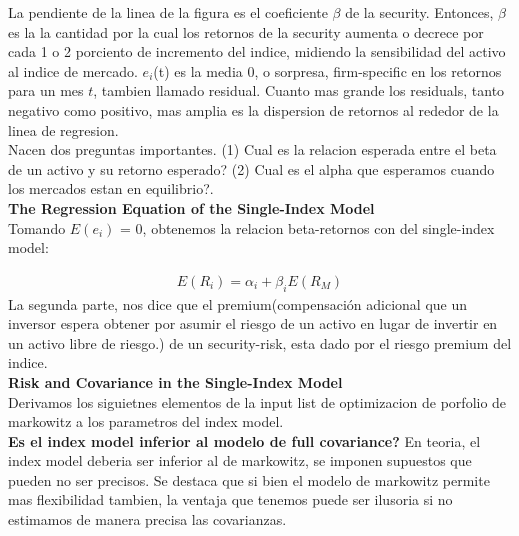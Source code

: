 \documentclass{article}
\begin{document}
La pendiente de la linea de la figura es el coeficiente $\beta$ de la security. Entonces, $\beta$ es la la cantidad por la cual los retornos de
la security aumenta o decrece por cada 1 o 2 porciento de incremento del indice, midiendo la sensibilidad del activo al indice de mercado.
$e_i$(t) es la media 0, o sorpresa, firm-specific en los retornos para un mes $t$, tambien llamado residual. Cuanto mas grande los residuals, tanto negativo como positivo,
 mas amplia es la dispersion de retornos al rededor de la linea de regresion. 
\\

Nacen dos preguntas importantes. (1) Cual es la relacion esperada entre el beta de un activo y su retorno esperado? 
(2) Cual es el alpha que esperamos cuando los mercados estan en equilibrio?.
\\

\textbf{The Regression Equation of the Single-Index Model}
\\

Tomando $E(e_i)$ = 0, obtenemos la relacion  beta-retornos con del single-index model:

\[
\begin{aligned}
E(R_i) = \alpha_i + \beta_i E(R_M)
\end{aligned}
\]
La segunda parte, nos dice que el premium(compensación adicional que un inversor espera obtener por asumir el riesgo de un activo en lugar de invertir en un activo libre de riesgo.) 
de un security-risk, esta dado por el riesgo premium del indice.
\\

\textbf{Risk and Covariance in the Single-Index Model}
\\
Derivamos los siguietnes elementos de la input list de optimizacion de porfolio de markowitz a los parametros del index model.
\\

\textbf{Es el index model inferior al modelo de full covariance?} En teoria, el index model deberia ser inferior
al de markowitz, se imponen supuestos que pueden no ser precisos. Se destaca que si bien el modelo de markowitz permite mas flexibilidad tambien, la ventaja
que tenemos puede ser ilusoria si no estimamos de manera precisa las covarianzas.
\end{document}
